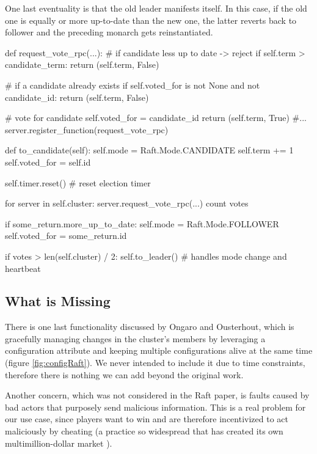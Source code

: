 One last eventuality is that the old leader manifests itself. In this case, if the old one is equally or more up-to-date than the new one, the latter reverts back to follower and the preceding monarch gets reinstantiated.

\begin{python}[label={code:requestVoteRPC}, caption={Pseudocode for \textit{request\_vote\_rpc}}]
def request_vote_rpc(...):
    # if candidate less up to date -> reject
    if self.term > candidate_term:
        return (self.term, False)

    # if a candidate already exists
    if self.voted_for is not None and not candidate_id:
        return (self.term, False)
    
    # vote for candidate
    self.voted_for = candidate_id
    return (self.term, True)
#...
server.register_function(request_vote_rpc)
\end{python}

\begin{python}[label={code:toCandidate}, caption={Pseudocode for \textit{to\_candidate}, gets fired on \textit{election timer} timeout}]
def to_candidate(self):
    self.mode = Raft.Mode.CANDIDATE
    self.term += 1
    self.voted_for = self.id
    
    self.timer.reset() # reset election timer

    for server in self.cluster:
        server.request_vote_rpc(...)
        count votes
    
    if some_return.more_up_to_date:
        self.mode = Raft.Mode.FOLLOWER
        self.voted_for = some_return.id
    
    if votes > len(self.cluster) / 2:
        self.to_leader()    # handles mode change and heartbeat
\end{python}

\subsection{What is Missing} \label{sec:raftMissing}

There is one last functionality discussed by Ongaro and Ousterhout, which is gracefully managing changes in the cluster's members by leveraging a configuration attribute and keeping multiple configurations alive at the same time (figure \ref{fig:configRaft}). We never intended to include it due to time constraints, therefore there is nothing we can add beyond the original work. 

Another concern, which was not considered in the Raft paper, is faults caused by bad actors that purposely send malicious information. This is a real problem for our use case, since players want to win and are therefore incentivized to act maliciously by cheating (a practice so widespread that has created its own multimillion-dollar market \cite{wiredCheat}).

